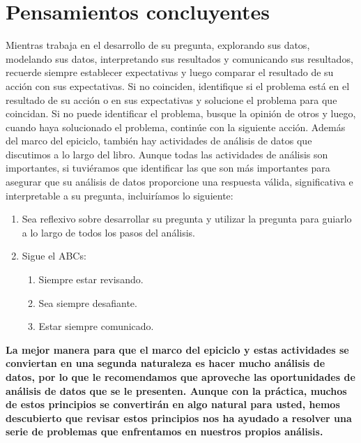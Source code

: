 \documentclass[10pt]{book}
\begin{document}
\chapter{Pensamientos concluyentes}
Mientras trabaja en el desarrollo de su pregunta, explorando sus datos, modelando sus datos, interpretando sus resultados y comunicando sus resultados, recuerde siempre establecer expectativas y luego comparar el resultado de su acción con sus expectativas. Si no coinciden, identifique si el problema está en el resultado de su acción o en sus expectativas y solucione el problema para que coincidan. Si no puede identificar el problema, busque la opinión de otros y luego, cuando haya solucionado el problema, continúe con la siguiente acción. Además del marco del epiciclo, también hay actividades de análisis de datos que discutimos a lo largo del libro. Aunque todas las actividades de análisis son importantes, si tuviéramos que identificar las que son más importantes para asegurar que su análisis de datos proporcione una respuesta válida, significativa e interpretable a su pregunta, incluiríamos lo siguiente:
\begin{enumerate}[\bfseries 1.]
    \item Sea reflexivo sobre desarrollar su pregunta y utilizar la pregunta para guiarlo a lo largo de todos los pasos del análisis.
    \item Sigue el ABCs:
	\begin{enumerate}[\bfseries a)]
	    \item Siempre estar revisando.
	    \item Sea siempre desafiante.
	    \item Estar siempre comunicado.
	\end{enumerate}
\end{enumerate}
\textbf{La mejor manera para que el marco del epiciclo y estas actividades se conviertan en una segunda naturaleza es hacer mucho análisis de datos, por lo que le recomendamos que aproveche las oportunidades de análisis de datos que se le presenten. Aunque con la práctica, muchos de estos principios se convertirán en algo natural para usted, hemos descubierto que revisar estos principios nos ha ayudado a resolver una serie de problemas que enfrentamos en nuestros propios análisis.}
\end{document}
